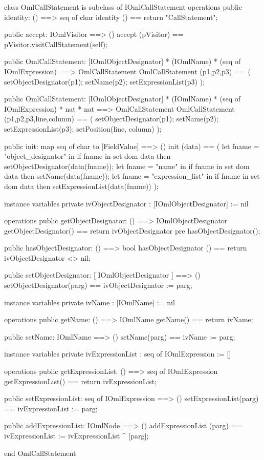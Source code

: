 \begin{vdm_al}
class OmlCallStatement is subclass of IOmlCallStatement
operations
  public identity: () ==> seq of char
  identity () == return "CallStatement";

  public accept: IOmlVisitor ==> ()
  accept (pVisitor) == pVisitor.visitCallStatement(self);

  public OmlCallStatement:
    [IOmlObjectDesignator] *
    (IOmlName) *
    (seq of IOmlExpression) ==> OmlCallStatement
  OmlCallStatement (p1,p2,p3) == 
    ( setObjectDesignator(p1);
      setName(p2);
      setExpressionList(p3) );

  public OmlCallStatement:
    [IOmlObjectDesignator] *
    (IOmlName) *
    (seq of IOmlExpression) *
    nat *
    nat ==> OmlCallStatement
  OmlCallStatement (p1,p2,p3,line,column) == 
    ( setObjectDesignator(p1);
      setName(p2);
      setExpressionList(p3);
      setPosition(line, column) );

  public init: map seq of char to [FieldValue] ==> ()
  init (data) ==
    ( let fname = "object_designator" in
        if fname in set dom data
        then setObjectDesignator(data(fname));
      let fname = "name" in
        if fname in set dom data
        then setName(data(fname));
      let fname = "expression_list" in
        if fname in set dom data
        then setExpressionList(data(fname)) );

instance variables
  private ivObjectDesignator : [IOmlObjectDesignator] := nil

operations
  public getObjectDesignator: () ==> IOmlObjectDesignator
  getObjectDesignator() == return ivObjectDesignator
    pre hasObjectDesignator();

  public hasObjectDesignator: () ==> bool
  hasObjectDesignator () == return ivObjectDesignator <> nil;

  public setObjectDesignator: [ IOmlObjectDesignator ] ==> ()
  setObjectDesignator(parg) == ivObjectDesignator := parg;

instance variables
  private ivName : [IOmlName] := nil

operations
  public getName: () ==> IOmlName
  getName() == return ivName;

  public setName: IOmlName ==> ()
  setName(parg) == ivName := parg;

instance variables
  private ivExpressionList : seq of IOmlExpression := []

operations
  public getExpressionList: () ==> seq of IOmlExpression
  getExpressionList() == return ivExpressionList;

  public setExpressionList: seq of IOmlExpression ==> ()
  setExpressionList(parg) == ivExpressionList := parg;

  public addExpressionList: IOmlNode ==> ()
  addExpressionList (parg) == ivExpressionList := ivExpressionList ^ [parg];

end OmlCallStatement
\end{vdm_al}

